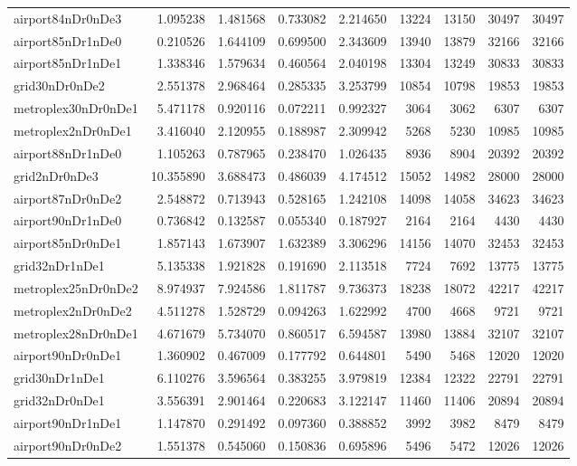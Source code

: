 \begin{longtable}{|l|r|r|r|r|r|r|r|r|}
airport84nDr0nDe3 & 1.095238 & 1.481568 & 0.733082 & 2.214650 & 13224 & 13150 & 30497 & 30497 \\
airport85nDr1nDe0 & 0.210526 & 1.644109 & 0.699500 & 2.343609 & 13940 & 13879 & 32166 & 32166 \\
airport85nDr1nDe1 & 1.338346 & 1.579634 & 0.460564 & 2.040198 & 13304 & 13249 & 30833 & 30833 \\
grid30nDr0nDe2 & 2.551378 & 2.968464 & 0.285335 & 3.253799 & 10854 & 10798 & 19853 & 19853 \\
metroplex30nDr0nDe1 & 5.471178 & 0.920116 & 0.072211 & 0.992327 & 3064 & 3062 & 6307 & 6307 \\
metroplex2nDr0nDe1 & 3.416040 & 2.120955 & 0.188987 & 2.309942 & 5268 & 5230 & 10985 & 10985 \\
airport88nDr1nDe0 & 1.105263 & 0.787965 & 0.238470 & 1.026435 & 8936 & 8904 & 20392 & 20392 \\
grid2nDr0nDe3 & 10.355890 & 3.688473 & 0.486039 & 4.174512 & 15052 & 14982 & 28000 & 28000 \\
airport87nDr0nDe2 & 2.548872 & 0.713943 & 0.528165 & 1.242108 & 14098 & 14058 & 34623 & 34623 \\
airport90nDr1nDe0 & 0.736842 & 0.132587 & 0.055340 & 0.187927 & 2164 & 2164 & 4430 & 4430 \\
airport85nDr0nDe1 & 1.857143 & 1.673907 & 1.632389 & 3.306296 & 14156 & 14070 & 32453 & 32453 \\
grid32nDr1nDe1 & 5.135338 & 1.921828 & 0.191690 & 2.113518 & 7724 & 7692 & 13775 & 13775 \\
metroplex25nDr0nDe2 & 8.974937 & 7.924586 & 1.811787 & 9.736373 & 18238 & 18072 & 42217 & 42217 \\
metroplex2nDr0nDe2 & 4.511278 & 1.528729 & 0.094263 & 1.622992 & 4700 & 4668 & 9721 & 9721 \\
metroplex28nDr0nDe1 & 4.671679 & 5.734070 & 0.860517 & 6.594587 & 13980 & 13884 & 32107 & 32107 \\
airport90nDr0nDe1 & 1.360902 & 0.467009 & 0.177792 & 0.644801 & 5490 & 5468 & 12020 & 12020 \\
grid30nDr1nDe1 & 6.110276 & 3.596564 & 0.383255 & 3.979819 & 12384 & 12322 & 22791 & 22791 \\
grid32nDr0nDe1 & 3.556391 & 2.901464 & 0.220683 & 3.122147 & 11460 & 11406 & 20894 & 20894 \\
airport90nDr1nDe1 & 1.147870 & 0.291492 & 0.097360 & 0.388852 & 3992 & 3982 & 8479 & 8479 \\
airport90nDr0nDe2 & 1.551378 & 0.545060 & 0.150836 & 0.695896 & 5496 & 5472 & 12026 & 12026 \\

\end{longtable}
